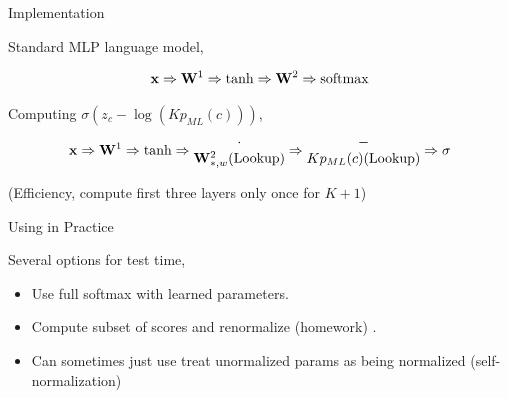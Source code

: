 \documentclass{beamer}
\begin{document}
\begin{frame}{Implementation}
  
  Standard MLP language model,

  \[\boldx \Rightarrow \boldW^1 \Rightarrow \tanh \Rightarrow  \boldW^2 \Rightarrow \softmax\]



  Computing $\sigma(z_c - \log(K p_{ML}(c)))$,
 \[\mathbf{x} \Rightarrow \mathbf{W}^1 \Rightarrow \tanh \Rightarrow
 \begin{matrix}
   \cdot \\ 
   \mathbf{W}^2_{*, w} \mathrm{(Lookup)}
 \end{matrix}
 \Rightarrow  \begin{matrix}
   - \\ 
   K p_{ML}(c) \mathrm{(Lookup)}
 \end{matrix}
\Rightarrow \sigma\]


 
                                                                                       

  (Efficiency, compute first three layers only once for $K+1$)
  \air 
  
\end{frame}

\begin{frame}{Using in Practice}
  
  Several options for test time,
  \begin{itemize}
  \item Use full softmax with learned parameters.
    \air 
  \item Compute subset of scores and renormalize (homework)
.
\air 

\item Can sometimes just use treat unormalized params as being normalized (self-normalization)
  \end{itemize}


\end{frame}
\end{document}
